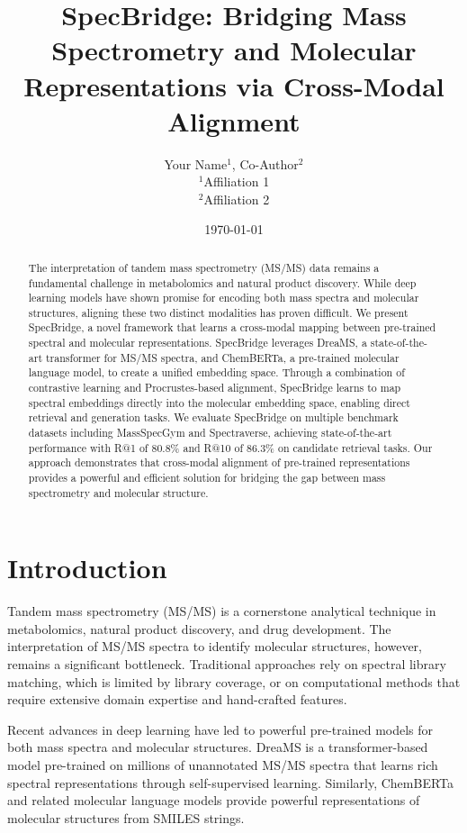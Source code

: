 \documentclass[11pt]{article}
\title{SpecBridge: Bridging Mass Spectrometry and Molecular Representations via Cross-Modal Alignment}
\author{Your Name$^1$, Co-Author$^2$ \\
$^1$Affiliation 1 \\
$^2$Affiliation 2}
\date{\today}
\begin{document}
\maketitle

\begin{abstract}
The interpretation of tandem mass spectrometry (MS/MS) data remains a fundamental challenge in metabolomics and natural product discovery. While deep learning models have shown promise for encoding both mass spectra and molecular structures, aligning these two distinct modalities has proven difficult. We present SpecBridge, a novel framework that learns a cross-modal mapping between pre-trained spectral and molecular representations. SpecBridge leverages DreaMS, a state-of-the-art transformer for MS/MS spectra, and ChemBERTa, a pre-trained molecular language model, to create a unified embedding space. Through a combination of contrastive learning and Procrustes-based alignment, SpecBridge learns to map spectral embeddings directly into the molecular embedding space, enabling direct retrieval and generation tasks. We evaluate SpecBridge on multiple benchmark datasets including MassSpecGym and Spectraverse, achieving state-of-the-art performance with R@1 of 80.8\% and R@10 of 86.3\% on candidate retrieval tasks. Our approach demonstrates that cross-modal alignment of pre-trained representations provides a powerful and efficient solution for bridging the gap between mass spectrometry and molecular structure.
\end{abstract}

\section{Introduction}

Tandem mass spectrometry (MS/MS) is a cornerstone analytical technique in metabolomics, natural product discovery, and drug development. The interpretation of MS/MS spectra to identify molecular structures, however, remains a significant bottleneck. Traditional approaches rely on spectral library matching, which is limited by library coverage, or on computational methods that require extensive domain expertise and hand-crafted features.

Recent advances in deep learning have led to powerful pre-trained models for both mass spectra and molecular structures. DreaMS \cite{bushuiev2025selfsupervised} is a transformer-based model pre-trained on millions of unannotated MS/MS spectra that learns rich spectral representations through self-supervised learning. Similarly, ChemBERTa \cite{chithrananda2020chemberta} and related molecular language models provide powerful representations of molecular structures from SMILES strings.
\end{document}
